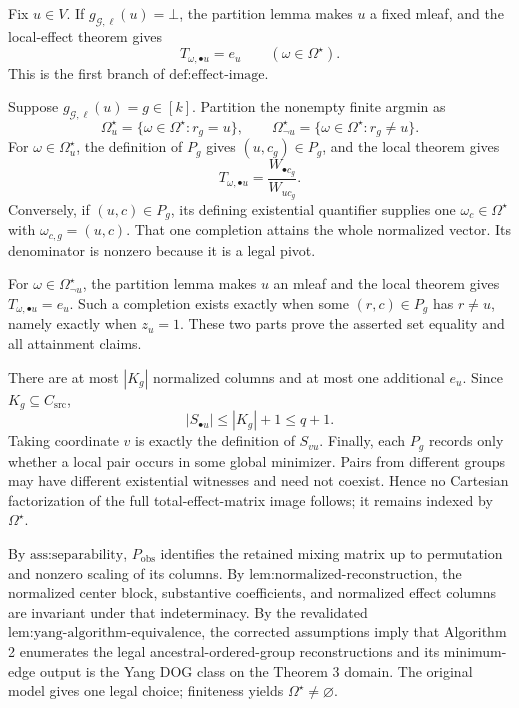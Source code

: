 Fix \(u\in V\). If \(g_{\mathcal G,\ell}(u)=\bot\), the partition lemma makes \(u\) a fixed mleaf, and the local-effect theorem gives
\[
T_{\omega,\bullet u}=e_u\qquad(\omega\in\Omega^\star).
\]
This is the first branch of \(\text{def:effect-image}\).

Suppose \(g_{\mathcal G,\ell}(u)=g\in[k]\). Partition the nonempty finite argmin as
\[
\Omega_u^\star=\{\omega\in\Omega^\star:r_g=u\},
\qquad
\Omega_{\neg u}^\star=\{\omega\in\Omega^\star:r_g\ne u\}.
\]
For \(\omega\in\Omega_u^\star\), the definition of \(P_g\) gives \((u,c_g)\in P_g\), and the local theorem gives
\[
T_{\omega,\bullet u}=\frac{W_{\bullet c_g}}{W_{uc_g}}.
\]
Conversely, if \((u,c)\in P_g\), its defining existential quantifier supplies one \(\omega_c\in\Omega^\star\) with \(\omega_{c,g}=(u,c)\). That one completion attains the whole normalized vector. Its denominator is nonzero because it is a legal pivot.

For \(\omega\in\Omega_{\neg u}^\star\), the partition lemma makes \(u\) an mleaf and the local theorem gives \(T_{\omega,\bullet u}=e_u\). Such a completion exists exactly when some \((r,c)\in P_g\) has \(r\ne u\), namely exactly when \(z_u=1\). These two parts prove the asserted set equality and all attainment claims.

There are at most \(|K_g|\) normalized columns and at most one additional \(e_u\). Since \(K_g\subseteq C_{\mathrm{src}}\),
\[
|S_{\bullet u}|\le |K_g|+1\le q+1.
\]
Taking coordinate \(v\) is exactly the definition of \(S_{vu}\). Finally, each \(P_g\) records only whether a local pair occurs in some global minimizer. Pairs from different groups may have different existential witnesses and need not coexist. Hence no Cartesian factorization of the full total-effect-matrix image follows; it remains indexed by \(\Omega^\star\).

By \(\text{ass:separability}\), \(P_{\mathrm{obs}}\) identifies the retained mixing matrix up to permutation and nonzero scaling of its columns. By \(\text{lem:normalized-reconstruction}\), the normalized center block, substantive coefficients, and normalized effect columns are invariant under that indeterminacy. By the revalidated \(\text{lem:yang-algorithm-equivalence}\), the corrected assumptions imply that Algorithm 2 enumerates the legal ancestral-ordered-group reconstructions and its minimum-edge output is the Yang DOG class on the Theorem 3 domain. The original model gives one legal choice; finiteness yields \(\Omega^\star\ne\varnothing\).

